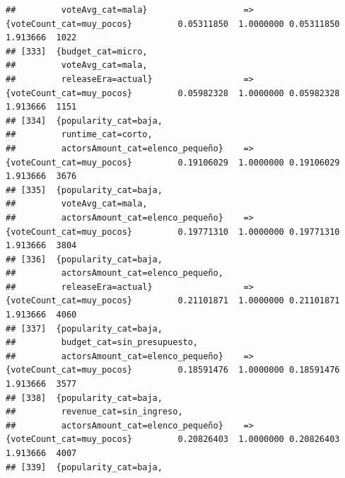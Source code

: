 \documentclass[
]{article}
\begin{document}
\begin{verbatim}
##         voteAvg_cat=mala}                   => {voteCount_cat=muy_pocos}         0.05311850  1.0000000 0.05311850 1.913666  1022
## [333]  {budget_cat=micro,                                                                                                       
##         voteAvg_cat=mala,                                                                                                       
##         releaseEra=actual}                  => {voteCount_cat=muy_pocos}         0.05982328  1.0000000 0.05982328 1.913666  1151
## [334]  {popularity_cat=baja,                                                                                                    
##         runtime_cat=corto,                                                                                                      
##         actorsAmount_cat=elenco_pequeño}    => {voteCount_cat=muy_pocos}         0.19106029  1.0000000 0.19106029 1.913666  3676
## [335]  {popularity_cat=baja,                                                                                                    
##         voteAvg_cat=mala,                                                                                                       
##         actorsAmount_cat=elenco_pequeño}    => {voteCount_cat=muy_pocos}         0.19771310  1.0000000 0.19771310 1.913666  3804
## [336]  {popularity_cat=baja,                                                                                                    
##         actorsAmount_cat=elenco_pequeño,                                                                                        
##         releaseEra=actual}                  => {voteCount_cat=muy_pocos}         0.21101871  1.0000000 0.21101871 1.913666  4060
## [337]  {popularity_cat=baja,                                                                                                    
##         budget_cat=sin_presupuesto,                                                                                             
##         actorsAmount_cat=elenco_pequeño}    => {voteCount_cat=muy_pocos}         0.18591476  1.0000000 0.18591476 1.913666  3577
## [338]  {popularity_cat=baja,                                                                                                    
##         revenue_cat=sin_ingreso,                                                                                                
##         actorsAmount_cat=elenco_pequeño}    => {voteCount_cat=muy_pocos}         0.20826403  1.0000000 0.20826403 1.913666  4007
## [339]  {popularity_cat=baja,                                                                                                    

\end{verbatim}
\end{document}
